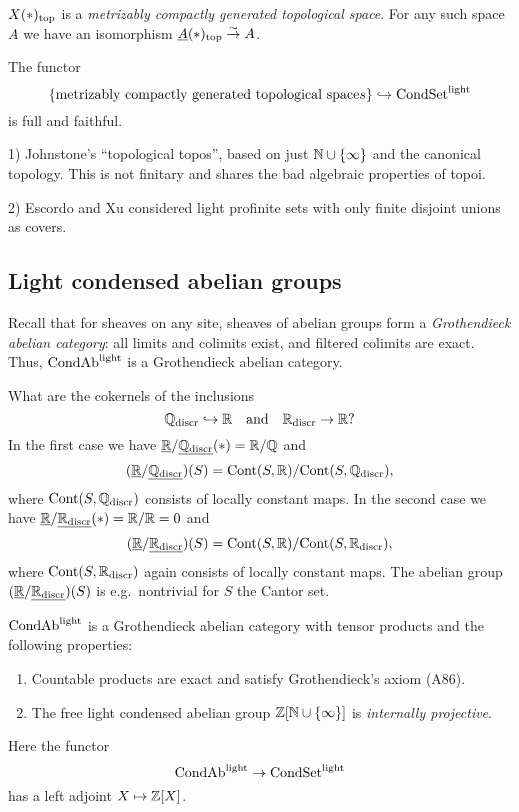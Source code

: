 \documentclass{notes}
\begin{document}
\begin{remark}
$X(*)_{\rm top}$ is a {\em metrizably compactly generated topological
  space}. For any such space $A$ we have an isomorphism
  $\underline{A}(*)_{\rm top}\stackrel{\sim}\to A$. 
\end{remark}

\begin{cor}
The functor
$$
  \{\text{metrizably compactly generated topological space}s\} \hookrightarrow
  \text{CondSet}^{\rm light}
$$
is full and faithful. 
\end{cor}

\begin{rem}
1) Johnstone's ``topological topos'', based on just ${\mathbb{N}}\cup\{\infty\}$
and the canonical topology. This is not finitary and shares the bad
algebraic properties of topoi. 

2) Escordo and Xu considered light profinite sets with only finite
disjoint unions as covers. 
\end{rem}

\subsection{Light condensed abelian groups}

Recall that for sheaves on any site, sheaves of abelian groups form a
{\em Grothendieck abelian category}: all limits and colimits exist,
and filtered colimits are exact. 
Thus, $\text{CondAb}^{\rm light}$ is a Grothendieck abelian category. 

\begin{example}
What are the cokernels of the inclusions
$$
  {\mathbb{Q}}_{\rm discr}\hookrightarrow{\mathbb{R}} \quad\text{and}\quad {\mathbb{R}}_{\rm discr}\to {\mathbb{R}}?
$$
In the first case we have $\underline{{\mathbb{R}}}/\underline{{\mathbb{Q}}_{\rm discr}}(*)={\mathbb{R}}/{\mathbb{Q}}$ and 
$$
  (\underline{{\mathbb{R}}}/\underline{{\mathbb{Q}}_{\rm discr}})(S) = {\rm Cont}(S,{\mathbb{R}})/{\rm Cont}(S,{\mathbb{Q}}_{\rm discr}),
$$
where ${\rm Cont}(S,{\mathbb{Q}}_{\rm discr})$ consists of locally constant maps.
In the second case we have $\underline{{\mathbb{R}}}/\underline{{\mathbb{R}}_{\rm discr}}(*)={\mathbb{R}}/{\mathbb{R}}=0$ and 
$$
  (\underline{{\mathbb{R}}}/\underline{{\mathbb{R}}_{\rm discr}})(S) = {\rm Cont}(S,{\mathbb{R}})/{\rm Cont}(S,{\mathbb{R}}_{\rm discr}),
$$
where ${\rm Cont}(S,{\mathbb{R}}_{\rm discr})$ again consists of locally constant maps.
The abelian group $(\underline{{\mathbb{R}}}/\underline{{\mathbb{R}}_{\rm discr}})(S)$ is e.g.~nontrivial for
$S$ the Cantor set.
\end{example}

\begin{thm}
$\text{CondAb}^{\rm light}$ is a Grothendieck abelian category with
  tensor products and the following properties:
\begin{enumerate}
\item Countable products are exact and satisfy Grothendieck's axiom
  (A86).
\item The free light condensed abelian group ${\mathbb{Z}}[{\mathbb{N}}\cup\{\infty\}]$ is
  {\em internally projective}. 
\end{enumerate}
\end{thm}

Here the functor 
$$
  \text{CondAb}^{\rm light} \to \text{CondSet}^{\rm light}
$$
has a left adjoint $X\mapsto {\mathbb{Z}}[X]$. 
  
\printbibliography
\end{document}
